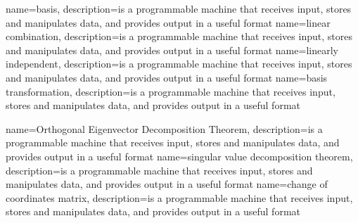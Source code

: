 {
  name=basis,
  description={is a programmable machine that receives input,
               stores and manipulates data, and provides
               output in a useful format}
}
{
  name=linear combination,
  description={is a programmable machine that receives input,
               stores and manipulates data, and provides
               output in a useful format}
}
{
  name=linearly independent,
  description={is a programmable machine that receives input,
               stores and manipulates data, and provides
               output in a useful format}
}
{
  name=basis transformation,
  description={is a programmable machine that receives input,
               stores and manipulates data, and provides
               output in a useful format}
}

{
  name=Orthogonal Eigenvector Decomposition Theorem,
  description={is a programmable machine that receives input,
               stores and manipulates data, and provides
               output in a useful format}
}
{
  name=singular value decomposition theorem,
  description={is a programmable machine that receives input,
               stores and manipulates data, and provides
               output in a useful format}
}
{
  name=change of coordinates matrix,
  description={is a programmable machine that receives input,
               stores and manipulates data, and provides
               output in a useful format}
}